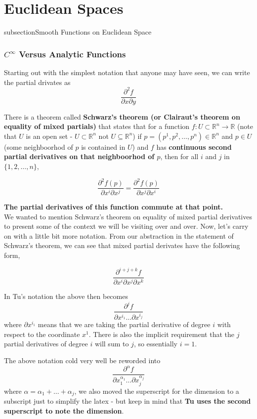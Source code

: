 \section{Euclidean Spaces}


subsection{Smooth Functions on Euclidean Space}

\subsubsection{$C^\infty$ Versus Analytic Functions}

Starting out with the simplest notation that anyone may have seen, we can write the partial drivates
as
$$
\frac{\partial^2 f}{\partial x \partial y}
$$

There is a theorem called \textbf{Schwarz's theorem (or Clairaut's theorem on equality of mixed partials)}
that states that for a function $f : U \subset \mathbb{R}^n \rightarrow \mathbb{R} $
(note that $U$ is an open set - $U \subset \mathbb{R}^n$ not $U \subseteq \mathbb{R}^n$)
if $p = (p^1, p^2, \ldots , p^n) \in \mathbb{R}^n$
and $p \in U$ (some neighboorhod of $p$ is contained in $U$)
and $f$ has \textbf{continuous second partial derivatives on that neighboorhod of $p$},
then for all $i$ and $j$ in $\{ 1, 2, \ldots , n \}$,

$$
\frac{\partial^2 f (p)}{\partial x^i \partial x^j}
= \frac{\partial^2 f (p)}{\partial x^j \partial x^i}
$$

\textbf{The partial derivatives of this function commute at that point.}
\\

We wanted to mention Schwarz's theorem on equality of mixed partial derivatives to present some of the context
we will be visiting over and over.
Now, let's carry on with a little bit more notation.
From our abstraction in the statement of Schwarz's theorem, we can see that mixed partial derivates have the following
form,

$$
\frac{\partial^{i+j+k} f}{\partial x^i \partial x^j \partial x^k}
$$

In Tu's notation the above then becomes
$$
\frac{\partial^j f}{\partial x^{i_1} \ldots \partial x^{i_j}}
$$
where $\partial x^{i_1}$ means that we are taking the partial derivative of degree $i$ with respect to the
coordinate $x^1$.
There is also the implicit requirement that the $j$ partial derivatives of degree $i$ will sum to $j$, so essentially
$i=1$.

The above notation cold very well be reworded into
$$
\frac{\partial^\alpha f}{\partial x^{\alpha_1}_{1} \ldots \partial x^{\alpha_j}_{j}}
$$
where $\alpha = \alpha_1 + \ldots + \alpha_j$, we also moved the superscript for the dimension to a subscript just
to simplify the latex - but keep in mind that \textbf{Tu uses the second superscript to note the dimension}.